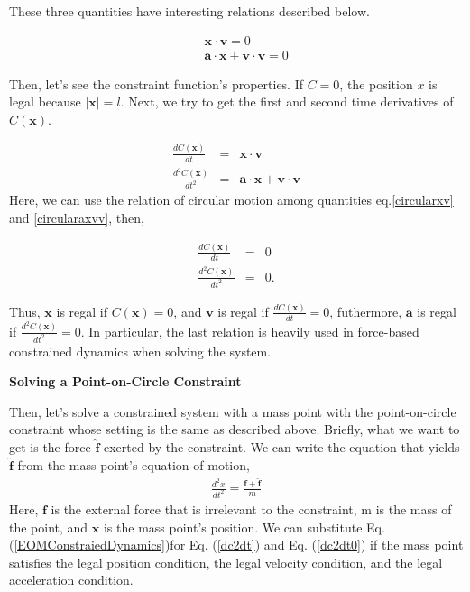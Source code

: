 \documentclass[pdflatex,sn-mathphys-num]{sn-jnl}%
\theoremstyle{thmstyleone}%
\theoremstyle{thmstyletwo}%
\theoremstyle{thmstylethree}%
\begin{document}
These three quantities have interesting relations described below.

\begin{eqnarray}
	& &\boldsymbol{x} \cdot  \boldsymbol{v} = 0\label{circularxv}\\
	& &\boldsymbol{a} \cdot  \boldsymbol{x} + \boldsymbol{v} \cdot \boldsymbol{v}= 0\label{circularaxvv}
\end{eqnarray}

Then, let's see the constraint function's properties.
If $C = 0$, the position $x$ is legal because $|\boldsymbol{x}| = l$.
Next, we try to get the first and second time derivatives of $C(\boldsymbol{x})$.

\begin{eqnarray}
	\frac{dC(\boldsymbol{x})}{dt} &=& \boldsymbol{x} \cdot \boldsymbol{v}\\
	\frac{d^2C(\boldsymbol{x})}{dt^2} &=&  \boldsymbol{a} \cdot \boldsymbol{x} + \boldsymbol{v} \cdot \boldsymbol{v}\label{dc2dt}
\end{eqnarray}
Here, we can use the relation of circular motion among quantities eq.\ref{circularxv} and \ref{circularaxvv}, then,

\begin{eqnarray}
	\frac{dC(\boldsymbol{x})}{dt} &=& 0\\
	\frac{d^2C(\boldsymbol{x})}{dt^2} &=& 0.\label{dc2dt0}
\end{eqnarray}

Thus, $\boldsymbol{x}$ is regal if $C(\boldsymbol{x}) = 0$, and $\boldsymbol{v}$ is regal if $\frac{dC(\boldsymbol{x})}{dt} = 0$, futhermore, $\boldsymbol{a}$ is regal if $\frac{d^2C(\boldsymbol{x})}{dt^2} = 0$. In particular, the last relation is heavily used in force-based constrained dynamics when solving the system.

\textbf{\noindent Solving a Point-on-Circle Constraint}

Then, let's solve a constrained system with a mass point with the point-on-circle constraint whose setting is the same as described above.
Briefly, what we want to get is the force $\boldsymbol{\hat{f}}$ exerted by the constraint. We can write the equation that yields $\boldsymbol{\hat{f}}$ from the mass point's equation of motion,
\begin{eqnarray}
	\frac{d^2 x}{dt^2} = \frac{\boldsymbol{f}+\boldsymbol{\hat{f}}}{m}\label{EOMConstraiedDynamics}
\end{eqnarray}
Here, $\boldsymbol{f}$ is the external force that is irrelevant to the constraint, m is the mass of the point, and $\boldsymbol{x}$ is the mass point's position. We can substitute Eq. (\ref{EOMConstraiedDynamics})for Eq. (\ref{dc2dt}) and Eq. (\ref{dc2dt0}) if the mass point satisfies the legal position condition, the legal velocity condition, and the legal acceleration condition.
\end{document}
